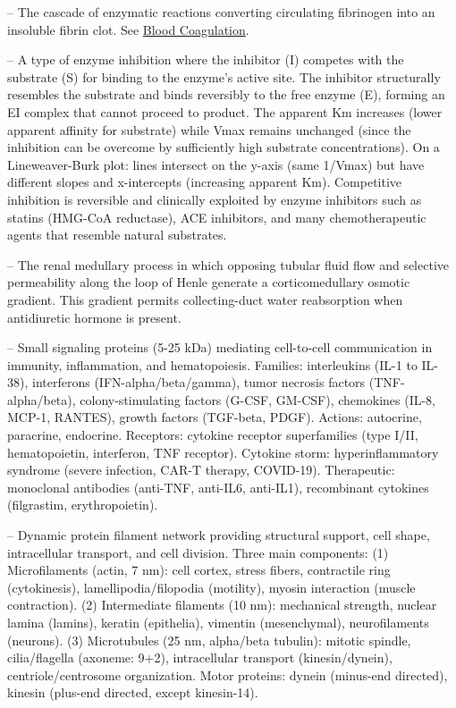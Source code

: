 -- The cascade of enzymatic reactions converting circulating fibrinogen into an insoluble fibrin clot. See \hyperlink{Blood Coagulation}{Blood Coagulation}.

-- A type of enzyme inhibition where the inhibitor (I) competes with the substrate (S) for binding to the enzyme's active site. The inhibitor structurally resembles the substrate and binds reversibly to the free enzyme (E), forming an EI complex that cannot proceed to product. The apparent Km increases (lower apparent affinity for substrate) while Vmax remains unchanged (since the inhibition can be overcome by sufficiently high substrate concentrations). On a Lineweaver-Burk plot: lines intersect on the y-axis (same 1/Vmax) but have different slopes and x-intercepts (increasing apparent Km). Competitive inhibition is reversible and clinically exploited by enzyme inhibitors such as statins (HMG-CoA reductase), ACE inhibitors, and many chemotherapeutic agents that resemble natural substrates.

-- The renal medullary process in which opposing tubular fluid flow and selective permeability along the loop of Henle generate a corticomedullary osmotic gradient. This gradient permits collecting-duct water reabsorption when antidiuretic hormone is present.

-- Small signaling proteins (5-25 kDa) mediating cell-to-cell communication in immunity, inflammation, and hematopoiesis. Families: interleukins (IL-1 to IL-38), interferons (IFN-alpha/beta/gamma), tumor necrosis factors (TNF-alpha/beta), colony-stimulating factors (G-CSF, GM-CSF), chemokines (IL-8, MCP-1, RANTES), growth factors (TGF-beta, PDGF). Actions: autocrine, paracrine, endocrine. Receptors: cytokine receptor superfamilies (type I/II, hematopoietin, interferon, TNF receptor). Cytokine storm: hyperinflammatory syndrome (severe infection, CAR-T therapy, COVID-19). Therapeutic: monoclonal antibodies (anti-TNF, anti-IL6, anti-IL1), recombinant cytokines (filgrastim, erythropoietin).

-- Dynamic protein filament network providing structural support, cell shape, intracellular transport, and cell division. Three main components: (1) Microfilaments (actin, 7 nm): cell cortex, stress fibers, contractile ring (cytokinesis), lamellipodia/filopodia (motility), myosin interaction (muscle contraction). (2) Intermediate filaments (10 nm): mechanical strength, nuclear lamina (lamins), keratin (epithelia), vimentin (mesenchymal), neurofilaments (neurons). (3) Microtubules (25 nm, alpha/beta tubulin): mitotic spindle, cilia/flagella (axoneme: 9+2), intracellular transport (kinesin/dynein), centriole/centrosome organization. Motor proteins: dynein (minus-end directed), kinesin (plus-end directed, except kinesin-14).

